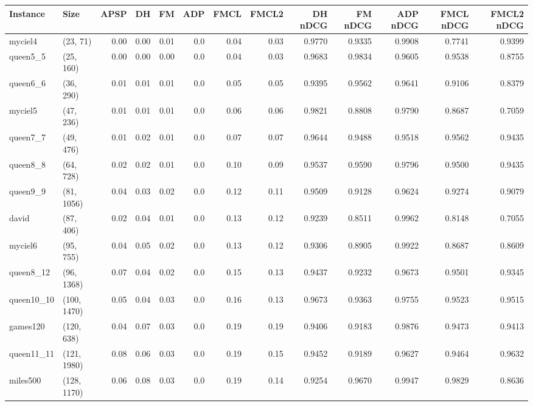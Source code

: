 \begin{tabular}{llrrrrrrrrrrr}
\toprule
  Instance &         Size &  APSP &   DH &   FM &  ADP &  FMCL &  FMCL2 &  DH nDCG &  FM nDCG &  ADP nDCG &  FMCL nDCG &  FMCL2 nDCG \\
\midrule
   myciel4 &     (23, 71) &  0.00 & 0.00 & 0.01 &  0.0 &  0.04 &   0.03 &   0.9770 &   0.9335 &    0.9908 &     0.7741 &      0.9399 \\
  queen5\_5 &    (25, 160) &  0.00 & 0.00 & 0.00 &  0.0 &  0.04 &   0.03 &   0.9683 &   0.9834 &    0.9605 &     0.9538 &      0.8755 \\
  queen6\_6 &    (36, 290) &  0.01 & 0.01 & 0.01 &  0.0 &  0.05 &   0.05 &   0.9395 &   0.9562 &    0.9641 &     0.9106 &      0.8379 \\
   myciel5 &    (47, 236) &  0.01 & 0.01 & 0.01 &  0.0 &  0.06 &   0.06 &   0.9821 &   0.8808 &    0.9790 &     0.8687 &      0.7059 \\
  queen7\_7 &    (49, 476) &  0.01 & 0.02 & 0.01 &  0.0 &  0.07 &   0.07 &   0.9644 &   0.9488 &    0.9518 &     0.9562 &      0.9435 \\
  queen8\_8 &    (64, 728) &  0.02 & 0.02 & 0.01 &  0.0 &  0.10 &   0.09 &   0.9537 &   0.9590 &    0.9796 &     0.9500 &      0.9435 \\
  queen9\_9 &   (81, 1056) &  0.04 & 0.03 & 0.02 &  0.0 &  0.12 &   0.11 &   0.9509 &   0.9128 &    0.9624 &     0.9274 &      0.9079 \\
     david &    (87, 406) &  0.02 & 0.04 & 0.01 &  0.0 &  0.13 &   0.12 &   0.9239 &   0.8511 &    0.9962 &     0.8148 &      0.7055 \\
   myciel6 &    (95, 755) &  0.04 & 0.05 & 0.02 &  0.0 &  0.13 &   0.12 &   0.9306 &   0.8905 &    0.9922 &     0.8687 &      0.8609 \\
 queen8\_12 &   (96, 1368) &  0.07 & 0.04 & 0.02 &  0.0 &  0.15 &   0.13 &   0.9437 &   0.9232 &    0.9673 &     0.9501 &      0.9345 \\
queen10\_10 &  (100, 1470) &  0.05 & 0.04 & 0.03 &  0.0 &  0.16 &   0.13 &   0.9673 &   0.9363 &    0.9755 &     0.9523 &      0.9515 \\
  games120 &   (120, 638) &  0.04 & 0.07 & 0.03 &  0.0 &  0.19 &   0.19 &   0.9406 &   0.9183 &    0.9876 &     0.9473 &      0.9413 \\
queen11\_11 &  (121, 1980) &  0.08 & 0.06 & 0.03 &  0.0 &  0.19 &   0.15 &   0.9452 &   0.9189 &    0.9627 &     0.9464 &      0.9632 \\
  miles500 &  (128, 1170) &  0.06 & 0.08 & 0.03 &  0.0 &  0.19 &   0.14 &   0.9254 &   0.9670 &    0.9947 &     0.9829 &      0.8636 \\

\end{tabular}
